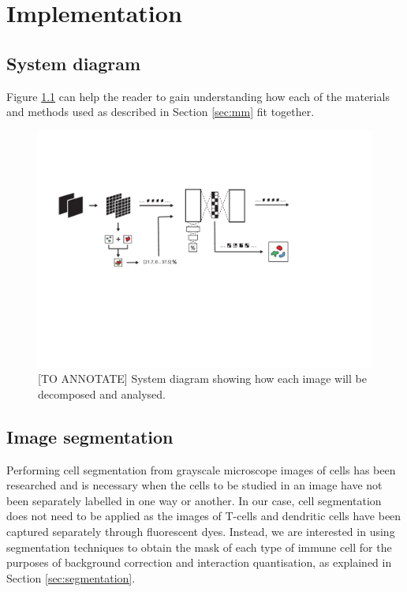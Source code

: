 \chapter{Implementation} \label{sec:implementation}

\section{System diagram}

Figure \ref{fig:system} can help the reader to gain understanding how each of the materials and methods used as described in Section \ref{sec:mm} fit together.

\begin{figure}[h!]
    \centering
    \includegraphics[width=\textwidth]{dissertation/figures/system_diagram.pdf}
    \caption{[TO ANNOTATE] System diagram showing how each image will be decomposed and analysed.}
    \label{fig:system}
\end{figure}

\section{Image segmentation}


Performing cell segmentation from grayscale microscope images of cells has been researched and is necessary when the cells to be studied in an image have not been separately labelled in one way or another. In our case, cell segmentation does not need to be applied as the images of T-cells and dendritic cells have been captured separately through fluorescent dyes. Instead, we are interested in using segmentation techniques to obtain the mask of each type of immune cell for the purposes of background correction and interaction quantisation, as explained in Section \ref{sec:segmentation}.

